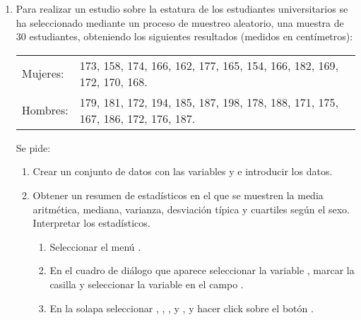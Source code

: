 \begin{enumerate}[leftmargin=*]
\item Para realizar un estudio sobre la estatura de los estudiantes universitarios se ha seleccionado mediante un
proceso de muestreo aleatorio, una muestra de 30 estudiantes, obteniendo los siguientes resultados (medidos en centímetros):
\begin{center}
\begin{tabular}{ll}
Mujeres: & 173, 158, 174, 166, 162, 177, 165, 154, 166, 182, 169, 172, 170, 168. \\
Hombres: & 179, 181, 172, 194, 185, 187, 198, 178, 188, 171, 175, 167, 186, 172, 176, 187. 
\end{tabular}
\end{center}
Se pide:

\begin{enumerate}
\item Crear un conjunto de datos con las variables  y  e introducir los datos.

\item Obtener un resumen de estadísticos en el que se muestren la media aritmética, mediana, varianza,
desviación típica y cuartiles según el sexo. Interpretar los estadísticos.
\begin{indicacion}{
\begin{enumerate}
\item Seleccionar el menú .
\item En el cuadro de diálogo que aparece seleccionar la variable , marcar la casilla  y seleccionar la variable  en el campo .
\item En la solapa  seleccionar , , ,
 y , y hacer click sobre el botón .
\end{enumerate}}
\end{indicacion}

\end{enumerate}
\end{enumerate}


